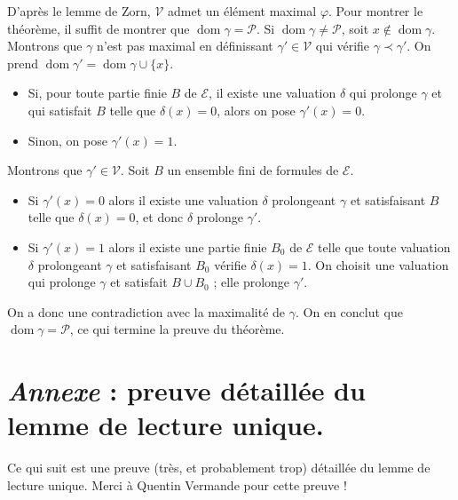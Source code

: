 \documentclass[./main]{subfiles}
\begin{document}
\begin{prv}
    D'après le lemme de Zorn, $\mathcal{V}$ admet un élément maximal $\varphi$.
    Pour montrer le théorème, il suffit de montrer que $\operatorname{dom} \gamma = \mathcal{P}$.
    Si $\operatorname{dom} \gamma \neq \mathcal{P}$, soit $x \not\in \operatorname{dom} \gamma$.
    Montrons que $\gamma$ n'est pas maximal en définissant $\gamma' \in \mathcal{V}$ qui vérifie $\gamma \prec \gamma'$.
    On prend $\operatorname{dom}\gamma' = \operatorname{dom} \gamma \cup \{x\}$.
    \begin{itemize}
      \item Si, pour toute partie finie $B$ de $\mathcal{E}$, il existe une valuation $\delta$ qui prolonge $\gamma$ et qui satisfait $B$ telle que $\delta(x) = 0$, alors on pose $\gamma'(x) = 0$.
      \item Sinon, on pose $\gamma'(x) = 1$.
    \end{itemize}
    Montrons que $\gamma' \in \mathcal{V}$.
    Soit $B$ un ensemble fini de formules de $\mathcal{E}$.
    \begin{itemize}
      \item Si $\gamma'(x) = 0$ alors il existe une valuation $\delta$ prolongeant $\gamma$ et satisfaisant $B$ telle que $\delta(x) = 0$, et donc  $\delta$ prolonge $\gamma'$.
      \item Si $\gamma'(x) = 1$ alors il existe une partie finie $B_0$ de $\mathcal{E}$ telle que toute valuation $\delta$ prolongeant $\gamma$ et satisfaisant $B_0$ vérifie $\delta(x) = 1$.
        On choisit une valuation qui prolonge $\gamma$ et satisfait $B \cup B_0$ ; elle prolonge $\gamma'$.
    \end{itemize}
    On a donc une contradiction avec la maximalité de $\gamma$. On en conclut que $\operatorname{dom} \gamma = \mathcal{P}$, ce qui termine la preuve du théorème.
  \end{prv}

  \clearpage

  \section{\textit{Annexe} : preuve détaillée du lemme de lecture unique.}
  \label{sect:annexe-lem-lecture-unique}

  Ce qui suit est une preuve (très, et probablement trop) détaillée du lemme de lecture unique.
  Merci à Quentin Vermande pour cette preuve !
\end{document}
